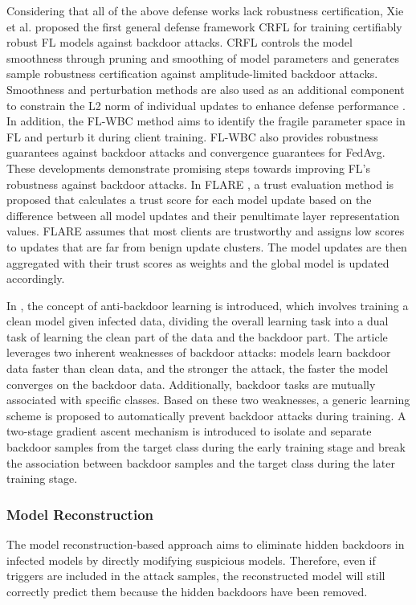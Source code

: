 \documentclass[conference]{IEEEtran}
\begin{document}
Considering that all of the above defense works lack robustness certification,
Xie et al. \cite{b86} proposed the first general defense framework CRFL for training certifiably robust FL models against backdoor attacks.
CRFL controls the model smoothness through pruning and smoothing of model parameters and generates sample robustness
certification against amplitude-limited backdoor attacks. Smoothness and perturbation methods are also used as an
additional component to constrain the L2 norm of individual updates to enhance defense performance \cite{b87}.
In addition, the FL-WBC \cite{b88} method aims to identify the fragile parameter space in FL and perturb it
during client training. FL-WBC also provides robustness guarantees against backdoor attacks and convergence guarantees for FedAvg.
These developments demonstrate promising steps towards improving FL's robustness against backdoor attacks. In FLARE \cite{b89}, a trust
evaluation method is proposed that calculates a trust score for each model update based on the difference between all model updates and
their penultimate layer representation values. FLARE assumes that most clients are trustworthy and assigns low scores
to updates that are far from benign update clusters. The model updates are then aggregated with their trust scores as
weights and the global model is updated accordingly.

In \cite{b98}, the concept of anti-backdoor learning is introduced, which involves training a clean model given infected data,
dividing the overall learning task into a dual task of learning the clean part of the data and the backdoor part.
The article leverages two inherent weaknesses of backdoor attacks: models learn backdoor data faster than clean data,
and the stronger the attack, the faster the model converges on the backdoor data. Additionally, backdoor tasks are mutually
associated with specific classes. Based on these two weaknesses, a generic learning scheme is proposed to automatically prevent
backdoor attacks during training. A two-stage gradient ascent mechanism is introduced to isolate and separate backdoor samples
from the target class during the early training stage and break the association between backdoor samples and the target class during the later training stage.
\subsubsection{Model Reconstruction}
The model reconstruction-based approach aims to eliminate hidden backdoors in infected models by directly modifying suspicious models.
Therefore, even if triggers are included in the attack samples, the reconstructed model will still correctly predict them because
the hidden backdoors have been removed.
\end{document}
